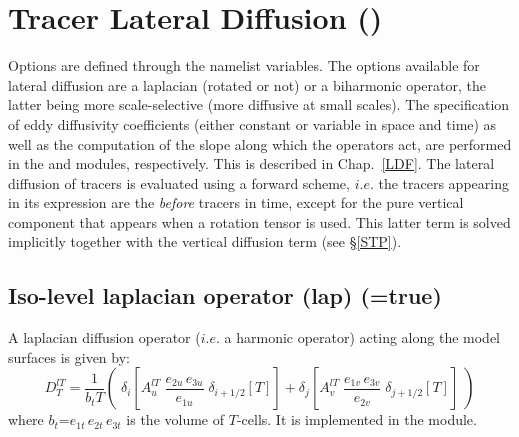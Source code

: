 \section  [Tracer Lateral Diffusion (\textit{traldf})]
		{Tracer Lateral Diffusion ()}
\label{TRA_ldf}
 
Options are defined through the   namelist variables.
The options available for lateral diffusion are a laplacian (rotated or not) 
or a biharmonic operator, the latter being more scale-selective (more 
diffusive at small scales). The specification of eddy diffusivity 
coefficients (either constant or variable in space and time) as well as the 
computation of the slope along which the operators act, are performed in the 
 and  modules, respectively. This is described in Chap.~\ref{LDF}. 
The lateral diffusion of tracers is evaluated using a forward scheme, 
$i.e.$ the tracers appearing in its expression are the \textit{before} tracers in time, 
except for the pure vertical component that appears when a rotation tensor 
is used. This latter term is solved implicitly together with the 
vertical diffusion term (see \S\ref{STP}).

\subsection   [Iso-level laplacian operator (lap) (\np{ln\_traldf\_lap})]
			{Iso-level laplacian operator (lap) (=true) }
\label{TRA_ldf_lap}

A laplacian diffusion operator ($i.e.$ a harmonic operator) acting along the model 
surfaces is given by: 
\begin{equation} \label{Eq_tra_ldf_lap}
D_T^{lT} =\frac{1}{b_tT} \left( \;
   \delta _{i}\left[ A_u^{lT} \; \frac{e_{2u}\,e_{3u}}{e_{1u}} \;\delta _{i+1/2} [T] \right] 
+ \delta _{j}\left[ A_v^{lT} \;  \frac{e_{1v}\,e_{3v}}{e_{2v}} \;\delta _{j+1/2} [T] \right]  \;\right)
\end{equation}
where  $b_t$=$e_{1t}\,e_{2t}\,e_{3t}$  is the volume of $T$-cells. 
It is implemented in the  module.

